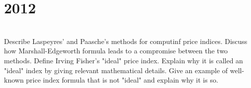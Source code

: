 \section*{2012}
\vspace{-.5cm}
\hrulefill \smallskip\\
 Describe Laspeyres' and Paasche's methods for computinf price indices. Discuss how Marshall-Edgeworth formula leads to a compromise between the two methods.
\myline
{} Define Irving Fisher's "ideal" price index. Explain why it is called an "ideal" index by giving relevant mathematical details. Give an example of well-known price index formula that is not "ideal" and explain why it is so.

